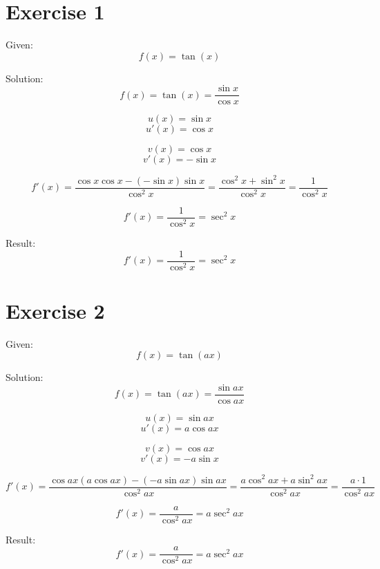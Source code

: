 \documentclass[a4paper, 10pt]{scrartcl}
\begin{document}
\section{Exercise 1}

Given:
\[f(x) = \tan(x)\]

Solution:
\[f(x) = \tan(x) = \frac{\sin{x}}{\cos{x}}\]

\[u(x) = \sin{x}\]
\[u'(x) = \cos{x}\]

\[v(x) = \cos{x}\]
\[v'(x) = -\sin{x}\]

\[f'(x) = \frac{\cos{x}\cos{x} - (-\sin{x})\sin{x}}{\cos^{2}{x}} =
         \frac{\cos^{2}{x} + \sin^{2}{x}}{\cos^{2}{x}} = \frac{1}{\cos^{2}{x}}\]

\[f'(x) = \frac{1}{\cos^{2}{x}} = \sec^{2}{x}\]


Result:
\[f'(x) = \frac{1}{\cos^{2}{x}} = \sec^{2}{x}\]

\section{Exercise 2}

Given:
\[f(x) = \tan(ax)\]

Solution:
\[f(x) = \tan(ax) = \frac{\sin{ax}}{\cos{ax}}\]

\[u(x) = \sin{ax}\]
\[u'(x) = a\cos{ax}\]

\[v(x) = \cos{ax}\]
\[v'(x) = -a\sin{x}\]

\[f'(x) = \frac{\cos{ax}(a\cos{ax}) - (-a\sin{ax})\sin{ax}}{\cos^{2}{ax}} =
         \frac{a\cos^{2}{ax} + a\sin^{2}{ax}}{\cos^{2}{ax}} = \frac{a\cdot 1}{\cos^{2}{ax}}\]

\[f'(x) = \frac{a}{\cos^{2}{ax}} = a\sec^{2}{ax}\]


Result:
\[f'(x) = \frac{a}{\cos^{2}{ax}} = a\sec^{2}{ax}\]
\end{document}
